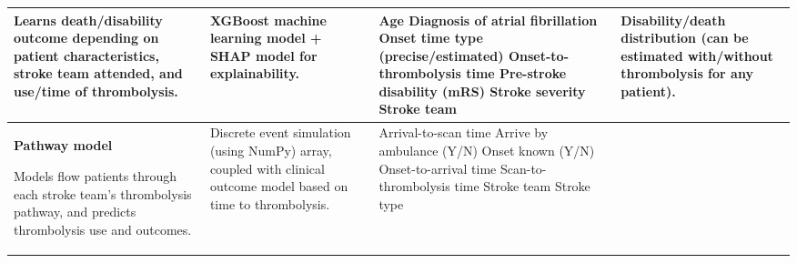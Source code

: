 \begin{landscape}
{\begin{table}
\begin{tabular}{|p{5cm}|p{5cm}|p{6cm}|p{6cm}|}
Learns death/disability outcome depending on patient characteristics, stroke team attended, and use/time of thrombolysis. &

XGBoost machine learning model + SHAP model for explainability. &

Age\newline\vspace{2pt}
Diagnosis of atrial fibrillation\newline\vspace{2pt}
Onset time type (precise/estimated)\newline\vspace{2pt}
Onset-to-thrombolysis time\newline\vspace{2pt}
Pre-stroke disability (mRS)\newline\vspace{2pt}
Stroke severity\newline\vspace{2pt}
Stroke team\newline &

Disability/death distribution (can be estimated with/without thrombolysis for any patient). \\

\hline


\textbf{Pathway model}

\vspace{3mm}

Models flow patients through each stroke team’s thrombolysis pathway, and predicts thrombolysis use and outcomes. &

Discrete event simulation (using NumPy) array, coupled with clinical outcome model based on time to thrombolysis. &

Arrival-to-scan time\newline\vspace{2pt}
Arrive by ambulance (Y/N)\newline\vspace{2pt}
Onset known (Y/N)\newline\vspace{2pt}
Onset-to-arrival time\newline\vspace{2pt}
Scan-to-thrombolysis time\newline\vspace{2pt}
Stroke team\newline\vspace{2pt}
Stroke type &


\end{tabular}
\end{table}}
\end{landscape}
